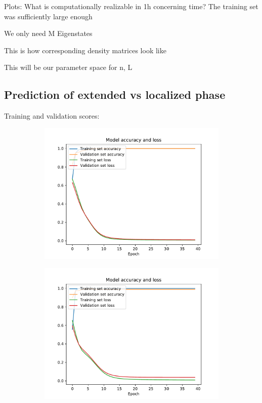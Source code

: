 \documentclass[reprint,amsmath,amssymb,aps,prb]{revtex4-2}
\begin{document}
Plots: 
What is computationally realizable in 1h concerning time?
The training set was sufficiently large enough 

We only need M Eigenstates

This is how corresponding density matrices look like

This will be our parameter space for n, L

\subsection{Prediction of extended vs localized phase}

Training and validation scores:

\newpage
\begin{figure}[h!]
	\begin{subfigure}[c]{0.3\textwidth}
		\includegraphics[width=\textwidth]{../results/N10_accuracy_loss_epochs}
		\label{fig:N10_accuracy_loss_epochs}
	\end{subfigure}
	\begin{subfigure}[c]{0.3\textwidth}
		\includegraphics[width=\textwidth]{../results/N11_accuracy_loss_epochs}

\end{subfigure}
\end{figure}
\end{document}
